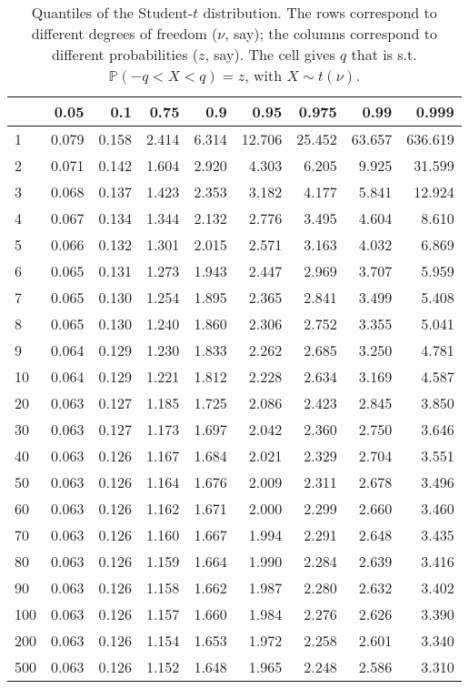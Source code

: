 \documentclass[
  12pt,
]{book}
\theoremstyle{definition}
\theoremstyle{definition}
\theoremstyle{definition}
\theoremstyle{definition}
\theoremstyle{remark}
\begin{document}
\begin{table}

\caption{\label{tab:Student}Quantiles of the Student-$t$ distribution. The rows correspond to different degrees of freedom ($\nu$, say); the columns correspond to different probabilities ($z$, say). The cell gives $q$ that is s.t. $\mathbb{P}(-q<X<q)=z$, with $X \sim t(\nu)$.}
\centering
\begin{tabular}[t]{l|r|r|r|r|r|r|r|r}
\hline
  & 0.05 & 0.1 & 0.75 & 0.9 & 0.95 & 0.975 & 0.99 & 0.999\\
\hline
1 & 0.079 & 0.158 & 2.414 & 6.314 & 12.706 & 25.452 & 63.657 & 636.619\\
\hline
2 & 0.071 & 0.142 & 1.604 & 2.920 & 4.303 & 6.205 & 9.925 & 31.599\\
\hline
3 & 0.068 & 0.137 & 1.423 & 2.353 & 3.182 & 4.177 & 5.841 & 12.924\\
\hline
4 & 0.067 & 0.134 & 1.344 & 2.132 & 2.776 & 3.495 & 4.604 & 8.610\\
\hline
5 & 0.066 & 0.132 & 1.301 & 2.015 & 2.571 & 3.163 & 4.032 & 6.869\\
\hline
6 & 0.065 & 0.131 & 1.273 & 1.943 & 2.447 & 2.969 & 3.707 & 5.959\\
\hline
7 & 0.065 & 0.130 & 1.254 & 1.895 & 2.365 & 2.841 & 3.499 & 5.408\\
\hline
8 & 0.065 & 0.130 & 1.240 & 1.860 & 2.306 & 2.752 & 3.355 & 5.041\\
\hline
9 & 0.064 & 0.129 & 1.230 & 1.833 & 2.262 & 2.685 & 3.250 & 4.781\\
\hline
10 & 0.064 & 0.129 & 1.221 & 1.812 & 2.228 & 2.634 & 3.169 & 4.587\\
\hline
20 & 0.063 & 0.127 & 1.185 & 1.725 & 2.086 & 2.423 & 2.845 & 3.850\\
\hline
30 & 0.063 & 0.127 & 1.173 & 1.697 & 2.042 & 2.360 & 2.750 & 3.646\\
\hline
40 & 0.063 & 0.126 & 1.167 & 1.684 & 2.021 & 2.329 & 2.704 & 3.551\\
\hline
50 & 0.063 & 0.126 & 1.164 & 1.676 & 2.009 & 2.311 & 2.678 & 3.496\\
\hline
60 & 0.063 & 0.126 & 1.162 & 1.671 & 2.000 & 2.299 & 2.660 & 3.460\\
\hline
70 & 0.063 & 0.126 & 1.160 & 1.667 & 1.994 & 2.291 & 2.648 & 3.435\\
\hline
80 & 0.063 & 0.126 & 1.159 & 1.664 & 1.990 & 2.284 & 2.639 & 3.416\\
\hline
90 & 0.063 & 0.126 & 1.158 & 1.662 & 1.987 & 2.280 & 2.632 & 3.402\\
\hline
100 & 0.063 & 0.126 & 1.157 & 1.660 & 1.984 & 2.276 & 2.626 & 3.390\\
\hline
200 & 0.063 & 0.126 & 1.154 & 1.653 & 1.972 & 2.258 & 2.601 & 3.340\\
\hline
500 & 0.063 & 0.126 & 1.152 & 1.648 & 1.965 & 2.248 & 2.586 & 3.310\\
\hline
\end{tabular}
\end{table}
\end{document}
